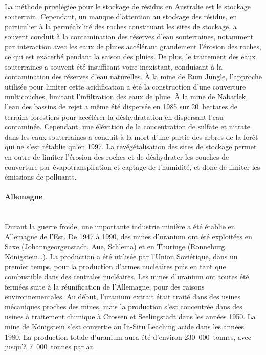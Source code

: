 \documentclass{article}
\begin{document}
La méthode privilégiée pour le stockage de résidus en Australie est le stockage souterrain. Cependant, un manque d’attention au stockage des résidus, en particulier à la perméabilité des roches constituant les sites de stockage, a souvent conduit à la contamination des réserves d’eau souterraines, notamment par interaction avec les eaux de pluies accélérant grandement l’érosion des roches, ce qui est exacerbé pendant la saison des pluies. De plus, le traitement des eaux souterraines a souvent été insuffisant voire inexistant, conduisant à la contamination des réserves d’eau naturelles. À la mine de Rum Jungle, l’approche utilisée pour limiter cette acidification a été la construction d’une couverture multicouches, limitant l’infiltration des eaux de pluie. À la mine de Nabarlek, l’eau des bassins de rejet a même été dispersée en 1985 sur 20~hectares de terrains forestiers pour accélérer la déshydratation en dispersant l’eau contaminée. Cependant, une élévation de la concentration de sulfate et nitrate dans les eaux souterraines a conduit à la mort d’une partie des arbres de la forêt qui ne s’est rétablie qu’en 1997.
La revégétalisation des sites de stockage permet en outre de limiter l’érosion des roches et de déshydrater les couches de couverture par évapotranspiration et captage de l’humidité, et donc de limiter les émissions de polluants.


\paragraph{Allemagne \\ \\}

Durant la guerre froide, une importante industrie minière a été établie en Allemagne de l’Est. De 1947 à 1990, des mines d’uranium ont été exploitées en Saxe (Johanngeorgenstadt, Aue, Schlema) et en Thuringe (Ronneburg, Königstein…). La production a été utilisée par l’Union Soviétique, dans un premier temps, pour la production d’armes nucléaires puis en tant que combustible dans des centrales nucléaires. Les mines d’uranium ont toutes été fermées suite à la réunification de l’Allemagne, pour des raisons environnementales. Au début, l’uranium extrait était traité dans des usines mécaniques proches des mines, mais la production s’est concentrée dans des usines à traitement chimique à Crossen et Seelingstädt dans les années 1950. La mine de Königstein s’est convertie au In-Situ Leaching acide dans les années 1980. La production totale d’uranium aura été d’environ 230~000~tonnes, avec jusqu’à 7~000~tonnes par an.
\end{document}
